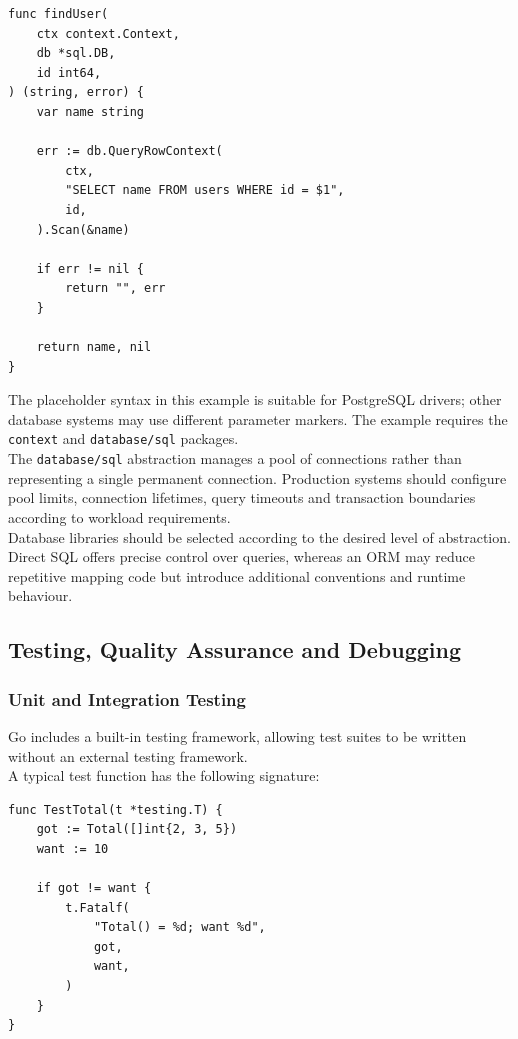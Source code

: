 \begin{lstlisting}
func findUser(
    ctx context.Context,
    db *sql.DB,
    id int64,
) (string, error) {
    var name string

    err := db.QueryRowContext(
        ctx,
        "SELECT name FROM users WHERE id = $1",
        id,
    ).Scan(&name)

    if err != nil {
        return "", err
    }

    return name, nil
}
\end{lstlisting}

The placeholder syntax in this example is suitable for PostgreSQL drivers; other database systems may use different parameter markers. The example requires the \texttt{context} and \texttt{database/sql} packages.\\

The \texttt{database/sql} abstraction manages a pool of connections rather than representing a single permanent connection. Production systems should configure pool limits, connection lifetimes, query timeouts and transaction boundaries according to workload requirements.\\

Database libraries should be selected according to the desired level of abstraction. Direct SQL offers precise control over queries, whereas an ORM may reduce repetitive mapping code but introduce additional conventions and runtime behaviour.

\subsection{Testing, Quality Assurance and Debugging}

\subsubsection{Unit and Integration Testing}

Go includes a built-in testing framework, allowing test suites to be written without an external testing framework.\\

A typical test function has the following signature:

\begin{lstlisting}
func TestTotal(t *testing.T) {
    got := Total([]int{2, 3, 5})
    want := 10

    if got != want {
        t.Fatalf(
            "Total() = %d; want %d",
            got,
            want,
        )
    }
}
\end{lstlisting}

